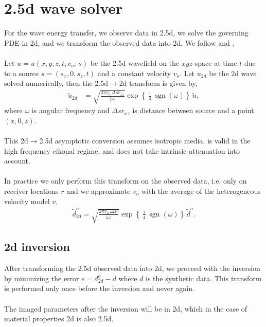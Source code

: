 \documentclass[a4paper,12pt]{article}
\begin{document}
\section*{2.5d wave solver}
For the wave energy transfer, we observe data in 2.5d, we solve the governing PDE in 2d, and we transform the observed data into 2d. We follow \cite{bleistein1986two} and \cite{ernst2007application}. 
\\\\
Let $u=u(x,y,z,t,v_o; \, s)$ be the 2.5d wavefield on the $xyz$-space at time $t$ due to a source $s=(s_x,0,s_z,t)$ and a constant velocity $v_o$. Let $u_{2d}$ be the 2d wave solved numerically, then the 2.5d$\to$2d transform is given by,
\begin{align}
\tilde{u}_{2d} &= \sqrt{ \frac{2\pi v_o\,\Delta sr_{xz}}{|\omega|} }
\exp\left\{{\frac{\imath}{4} \operatorname{sgn} (\omega)}\right\}\,\tilde{u},
\end{align}
where $\omega$ is angular frequency and $\Delta sr_{xz}$ is distance between source and a point $(x,0,z)$. 
\\\\
This 2d$\to$2.5d asymptotic conversion assumes isotropic media, is valid in the high frequency eikonal regime, and does not take intrinsic attenuation into account.
\\\\
In practice we only perform this transform on the observed data, i.e. only on receiver locations $r$ and we approximate $v_o$ with the average of the heterogeneous velocity model $v$,
\begin{align}
\tilde{d}_{2d}^o = \sqrt{ \frac{2\pi v_o\,\Delta sr}{|\omega|} }
\exp\left\{{\frac{\imath}{4} \operatorname{sgn} (\omega)}\right\}\,\tilde{d}^o.
\label{eq:w2d}
\end{align}
\subsection*{2d inversion}
After transforming the 2.5d observed data into 2d, we proceed with the inversion by minimizing the error $e=d_{2d}^{o}-d$ where $d$ is the synthetic data. This transform is performed only once before the inversion and never again.
\\\\
The imaged parameters after the inversion will be in 2d, which in the case of material properties 2d is also 2.5d. 
\end{document}
